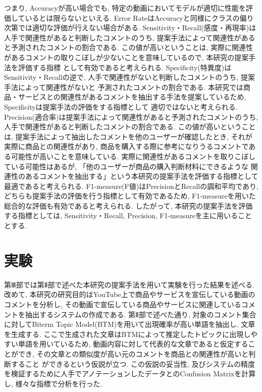 \documentclass{ltjarticle}
\begin{document}
\newpage
\noindent
つまり, Accuracyが高い場合でも, 特定の動画においてモデルが適切に性能を評価しているとは限らないといえる. 
Error RateはAccuracyと同様にクラスの偏り次第では適切な評価が行えない場合がある. 
Sensitivity・Recall(感度・再現率)は人手で関連性があると判断したコメントのうち, 提案手法によって関連性があると予測されたコメントの割合である. 
この値が高いということは, 実際に関連性があるコメントの取りこぼしが少ないことを意味しているので, 本研究の提案手法を評価する指標
として有効であると考えられる. 
Specificity(特異度)はSensitivity・Recallの逆で, 人手で関連性がないと判断したコメントのうち, 提案手法によって関連性がないと
予測されたコメントの割合である. 
本研究では商品・サービスとの関連性があるコメントを抽出する手法を提案しているため, Specificityは提案手法の評価をする指標として
適切ではないと考えられる. 
Precision(適合率)は提案手法によって関連性があると予測されたコメントのうち, 人手で関連性があると判断したコメントの割合である. 
この値が高いということは, 提案手法によって抽出したコメントを他のユーザーが確認したとき, それが実際に商品との関連性があり, 
商品を購入する際に参考になりうるコメントである可能性が高いことを意味している. 
実際に関連性があるコメントを取りこぼしている可能性はあるが, 「他のユーザーが商品の購入判断材料にできるような
関連性のあるコメントを抽出する」という本研究の提案手法を評価する指標として最適であると考えられる. 
F1-measure(F値)はPrecisionとRecallの調和平均であり, どちらも提案手法の評価を行う指標として有効であるため, 
F1-measureを用いた総合的な評価も有効であると考えられる. したがって, 本研究の提案手法を評価する指標としては, Sensitivity・Recall, 
Precision, F1-measureを主に用いることとする. 

\newpage
\part{実験}
第Ⅲ部では第Ⅱ部で述べた本研究の提案手法を用いて実験を行った結果を述べる. 
改めて, 本研究の研究目的はYouTube上で商品やサービスを宣伝している動画のコメントを分析し, 
その動画で宣伝している商品やサービスに関連しているコメントを抽出するシステムの作成である. 
第Ⅱ部で述べた通り, 対象のコメント集合に対してBiterm Topic Model(BTM)を用いて出現確率が高い単語を抽出し,
文章を生成する. 
ここで生成された文章はBTMによって推定したトピックに出現しやすい単語を用いているため, 
動画内容に対して代表的な文章であると仮定することができ, その文章との類似度が高い元のコメントを商品との関連性が高いと判断すること
ができるという仮説が立つ. 
この仮説の妥当性, 及びシステムの精度を検証するために人手でアノテーションしたデータとのConfusion Matrixを計算し, 
様々な指標で分析を行った. 
\end{document}
